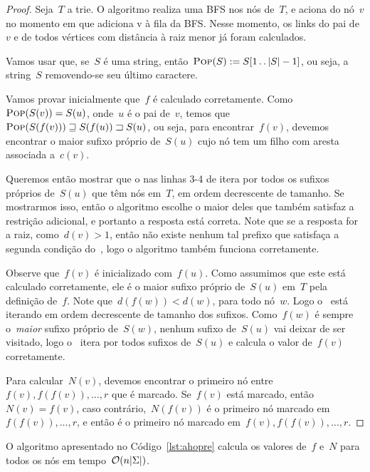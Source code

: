 \begin{proof}
Seja~$T$ a trie. O algoritmo realiza uma BFS nos nós de~$T$, e aciona  do nó~$v$ no momento em que adiciona v à fila da BFS. Nesse momento, os links do pai de~$v$ e de todos vértices com distância à raiz menor já foram calculados.

Vamos usar que, se~$S$ é uma string, então~$\textsc{Pop}(S) := S[1\,.\,.\, |S|-1]$, ou seja, a string~$S$ removendo-se seu último caractere.

Vamos provar inicialmente que~$f$ é calculado corretamente. Como~${\textsc{Pop}(S(v)) = S(u)}$, onde~$u$ é o pai de~$v$, temos que~$\textsc{Pop}(S(f(v))) \sqsupseteq S(f(u)) \sqsupset S(u)$, ou seja, para encontrar~$f(v)$, devemos encontrar o maior sufixo próprio de~$S(u)$ cujo nó tem um filho com aresta associada a~$c(v)$.

Queremos então mostrar que o  nas linhas 3-4 de  itera por todos os sufixos próprios de~$S(u)$ que têm nós em~$T$, em ordem decrescente de tamanho. Se mostrarmos isso, então o algoritmo escolhe o maior deles que também satisfaz a restrição adicional, e portanto a resposta está correta. Note que se a resposta for a raiz, como~$d(v) > 1$, então não existe nenhum tal prefixo que satisfaça a segunda condição do~, logo o algoritmo também funciona corretamente.

Observe que~$f(v)$ é inicializado com~$f(u)$. Como assumimos que este está calculado corretamente, ele é o maior sufixo próprio de~$S(u)$ em~$T$ pela definição de~$f$. Note que~${d(f(w)) < d(w)}$, para todo nó~$w$. Logo o~ está iterando em ordem decrescente de tamanho dos sufixos. Como~$f(w)$ é sempre o~\emph{maior} sufixo próprio de~$S(w)$, nenhum sufixo de~$S(u)$ vai deixar de ser visitado, logo o~ itera por todos sufixos de~$S(u)$ e calcula o valor de~$f(v)$ corretamente.

Para calcular~$N(v)$, devemos encontrar o primeiro nó entre~$f(v), f(f(v)), \ldots, r$ que é marcado. Se~$f(v)$ está marcado, então~$N(v) = f(v)$, caso contrário,~$N(f(v))$ é o primeiro nó marcado em~$f(f(v)), \ldots, r$, e então é o primeiro nó marcado em~$f(v), f(f(v)), \ldots, r$.

\end{proof}


\begin{complexity}
O algoritmo apresentado no Código~\ref{lst:ahopre} calcula os valores de~$f$ e~$N$ para todos os nós em tempo~$\mathcal{O}(n|\Sigma|)$.
\end{complexity}

